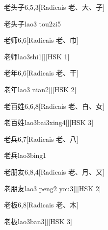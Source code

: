 \begin{entry}{老头子}{6,5,3}[Radicais ⽼、⼤、⼦]
  \begin{phonetics}{老头子}{lao3 tou2zi5}
  \end{phonetics}
\end{entry}

\begin{entry}{老师}{6,6}[Radicais ⽼、⼱]
  \begin{phonetics}{老师}{lao3shi1}[][HSK 1]
  \end{phonetics}
\end{entry}

\begin{entry}{老年}{6,6}[Radicais ⽼、⼲]
  \begin{phonetics}{老年}{lao3 nian2}[][HSK 2]
  \end{phonetics}
\end{entry}

\begin{entry}{老百姓}{6,6,8}[Radicais ⽼、⽩、⼥]
  \begin{phonetics}{老百姓}{lao3bai3xing4}[][HSK 3]
  \end{phonetics}
\end{entry}

\begin{entry}{老兵}{6,7}[Radicais ⽼、⼋]
  \begin{phonetics}{老兵}{lao3bing1}
  \end{phonetics}
\end{entry}

\begin{entry}{老朋友}{6,8,4}[Radicais ⽼、⽉、⼜]
  \begin{phonetics}{老朋友}{lao3 peng2 you3}[][HSK 2]
  \end{phonetics}
\end{entry}

\begin{entry}{老板}{6,8}[Radicais ⽼、⽊]
  \begin{phonetics}{老板}{lao3ban3}[][HSK 3]
  \end{phonetics}
\end{entry}

